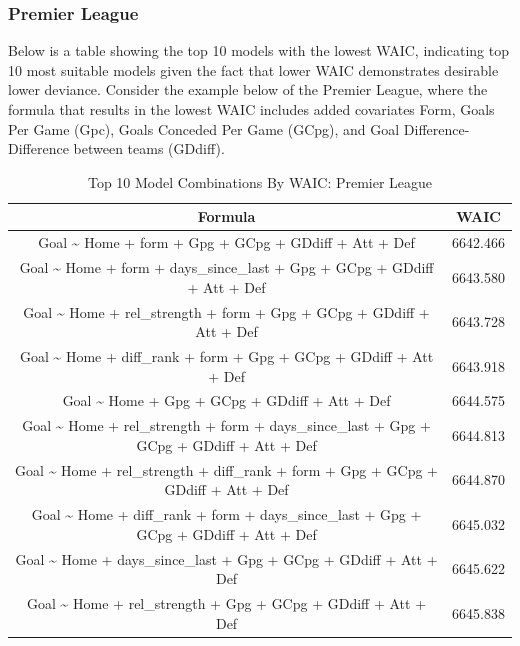 \documentclass[
]{article}
\begin{document}
\hypertarget{premier-league}{%
\subsubsection{Premier League}\label{premier-league}}

Below is a table showing the top 10 models with the lowest WAIC,
indicating top 10 most suitable models given the fact that lower WAIC
demonstrates desirable lower deviance. Consider the example below of the
Premier League, where the formula that results in the lowest WAIC
includes added covariates Form, Goals Per Game (Gpc), Goals Conceded Per
Game (GCpg), and Goal Difference-Difference between teams (GDdiff).

\begin{table}[!h]

\caption{\label{tab:unnamed-chunk-2}Top 10 Model Combinations By WAIC: Premier League}
\centering
\begin{tabular}[t]{c|c}
\hline
Formula & WAIC\\
\hline
Goal \textasciitilde{} Home + form + Gpg + GCpg + GDdiff + Att + Def & 6642.466\\
\hline
Goal \textasciitilde{} Home + form + days\_since\_last + Gpg + GCpg + GDdiff + Att + Def & 6643.580\\
\hline
Goal \textasciitilde{} Home + rel\_strength + form + Gpg + GCpg + GDdiff + Att + Def & 6643.728\\
\hline
Goal \textasciitilde{} Home + diff\_rank + form + Gpg + GCpg + GDdiff + Att + Def & 6643.918\\
\hline
Goal \textasciitilde{} Home + Gpg + GCpg + GDdiff + Att + Def & 6644.575\\
\hline
Goal \textasciitilde{} Home + rel\_strength + form + days\_since\_last + Gpg + GCpg + GDdiff + Att + Def & 6644.813\\
\hline
Goal \textasciitilde{} Home + rel\_strength + diff\_rank + form + Gpg + GCpg + GDdiff + Att + Def & 6644.870\\
\hline
Goal \textasciitilde{} Home + diff\_rank + form + days\_since\_last + Gpg + GCpg + GDdiff + Att + Def & 6645.032\\
\hline
Goal \textasciitilde{} Home + days\_since\_last + Gpg + GCpg + GDdiff + Att + Def & 6645.622\\
\hline
Goal \textasciitilde{} Home + rel\_strength + Gpg + GCpg + GDdiff + Att + Def & 6645.838\\
\hline
\end{tabular}
\end{table}
\end{document}
